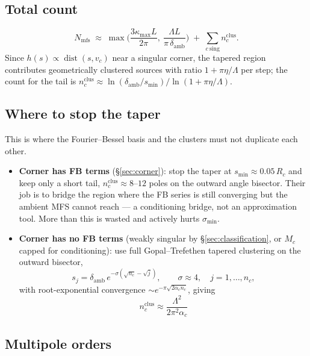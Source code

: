 \documentclass[11pt]{article}
\newcommand{\dist}{\operatorname{dist}}
\begin{document}
\subsection{Total count}

\[
  N_{\mathrm{mfs}}\;\approx\;
  \max\Big(\frac{3\kappa_{\max}L}{2\pi},\ \frac{\Lambda L}{\pi\,\delta_{\mathrm{amb}}}\Big)
  \;+\;\sum_{c\ \mathrm{sing}} n_c^{\mathrm{clus}}.
\]
Since $h(s)\propto\dist(s,v_c)$ near a singular corner, the tapered region contributes
geometrically clustered sources with ratio $1+\pi\eta/\Lambda$ per step; the count for
the tail is
$n_c^{\mathrm{clus}}\approx \ln(\delta_{\mathrm{amb}}/s_{\min})
\big/\ln(1+\pi\eta/\Lambda)$.

\subsection{Where to stop the taper}

This is where the Fourier--Bessel basis and the clusters must not duplicate each other.

\begin{itemize}[leftmargin=1.4em]
\item \textbf{Corner has FB terms} (\S\ref{sec:corner}): stop the taper at
  $s_{\min}\approx 0.05\,R_c$ and keep only a short tail,
  $n_c^{\mathrm{clus}}\approx 8$--$12$ poles on the outward angle bisector. Their job
  is to bridge the region where the FB series is still converging but the ambient MFS
  cannot reach --- a conditioning bridge, not an approximation tool. More than this is
  wasted and actively hurts $\sigma_{\min}$.
\item \textbf{Corner has no FB terms} (weakly singular by \S\ref{sec:classification},
  or $M_c$ capped for conditioning): use full Gopal--Trefethen tapered clustering on
  the outward bisector,
  \[
    s_j=\delta_{\mathrm{amb}}\,e^{-\sigma(\sqrt{n_c}-\sqrt{j})},
    \qquad \sigma\approx4,\quad j=1,\dots,n_c,
  \]
  with root-exponential convergence $\sim e^{-\pi\sqrt{2\alpha_c n_c}}$, giving
  \begin{equation}
    \boxed{\;n_c^{\mathrm{clus}}\approx\frac{\Lambda^2}{2\pi^2\alpha_c}\;}
    \label{eq:lightning}
  \end{equation}
\end{itemize}

\subsection{Multipole orders}
\end{document}
